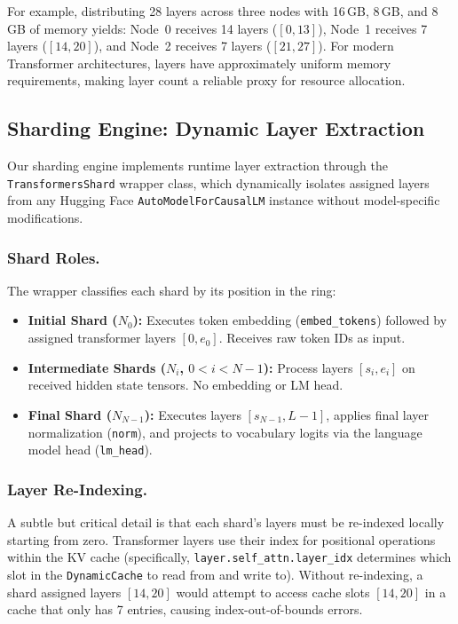 \documentclass[runningheads]{llncs}
\begin{document}
For example, distributing 28 layers across three nodes with 16\,GB, 8\,GB, and 8\,GB of memory yields: Node~0 receives 14 layers ($[0,13]$), Node~1 receives 7 layers ($[14,20]$), and Node~2 receives 7 layers ($[21,27]$). For modern Transformer architectures, layers have approximately uniform memory requirements, making layer count a reliable proxy for resource allocation.

\subsection{Sharding Engine: Dynamic Layer Extraction}
\label{sec:sharding}

Our sharding engine implements runtime layer extraction through the \texttt{TransformersShard} wrapper class, which dynamically isolates assigned layers from any Hugging Face \texttt{AutoModelForCausalLM} instance without model-specific modifications.

\subsubsection{Shard Roles.} The wrapper classifies each shard by its position in the ring:

\begin{itemize}
    \item \textbf{Initial Shard ($N_0$):} Executes token embedding (\texttt{embed\_tokens}) followed by assigned transformer layers $[0, e_0]$. Receives raw token IDs as input.
    \item \textbf{Intermediate Shards ($N_i$, $0 < i < N\!-\!1$):} Process layers $[s_i, e_i]$ on received hidden state tensors. No embedding or LM head.
    \item \textbf{Final Shard ($N_{N-1}$):} Executes layers $[s_{N-1}, L\!-\!1]$, applies final layer normalization (\texttt{norm}), and projects to vocabulary logits via the language model head (\texttt{lm\_head}).
\end{itemize}

\subsubsection{Layer Re-Indexing.} A subtle but critical detail is that each shard's layers must be re-indexed locally starting from zero. Transformer layers use their index for positional operations within the KV cache (specifically, \texttt{layer.self\_attn.layer\_idx} determines which slot in the \texttt{DynamicCache} to read from and write to). Without re-indexing, a shard assigned layers $[14, 20]$ would attempt to access cache slots $[14, 20]$ in a cache that only has 7 entries, causing index-out-of-bounds errors.
\end{document}
